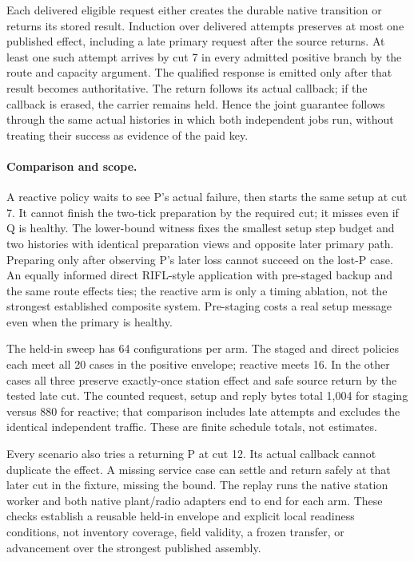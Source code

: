 \documentclass{article}
\begin{document}
Each delivered eligible request either creates the durable native
transition or returns its stored result. Induction over delivered
attempts preserves at most one published effect, including a late
primary request after the source returns. At least one such attempt
arrives by cut 7 in every admitted positive branch by the route and
capacity argument. The qualified response is emitted only after that
result becomes authoritative. The return follows its actual callback;
if the callback is erased, the carrier remains held. Hence the joint
guarantee follows through the same actual histories in which both
independent jobs run, without treating their success as evidence of the
paid key.

\paragraph{Comparison and scope.}
A reactive policy waits to see P's actual failure, then starts the
same setup at cut 7. It cannot finish the two-tick preparation by the
required cut; it misses even if Q is healthy. The lower-bound witness
fixes the smallest setup step budget and two histories with identical
preparation views and opposite later primary path. Preparing only
after observing P's later loss cannot succeed on the lost-P case.
An equally informed direct RIFL-style application with pre-staged
backup and the same route effects ties; the reactive arm is only
a timing ablation, not the strongest established composite system.
Pre-staging costs a real setup message even when the primary is healthy.

The held-in sweep has 64 configurations per arm. The staged and direct
policies each meet all 20 cases in the positive envelope; reactive meets
16. In the other cases all three preserve exactly-once station effect
and safe source return by the tested late cut. The counted request,
setup and reply bytes total 1,004 for staging versus 880 for reactive;
that comparison includes late attempts and excludes the identical
independent traffic. These are finite schedule totals, not estimates.

Every scenario also tries a returning P at cut 12. Its actual callback
cannot duplicate the effect. A missing service case can settle and
return safely at that later cut in the fixture, missing the bound.
The replay runs the native station worker and both native plant/radio
adapters end to end for each arm. These checks establish a reusable
held-in envelope and explicit local readiness conditions, not inventory
coverage, field validity, a frozen transfer, or advancement over the
strongest published assembly.
\end{document}
